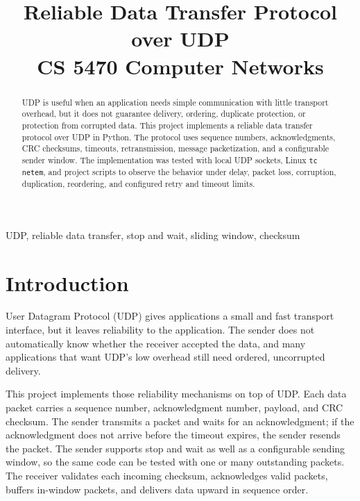 \documentclass[conference]{IEEEtran}
\begin{document}
\title{Reliable Data Transfer Protocol over UDP\\
{\footnotesize CS 5470 Computer Networks}
}

\author{
\and
{}
}

\maketitle

\begin{abstract}
UDP is useful when an application needs simple communication with little
transport overhead, but it does not guarantee delivery, ordering, duplicate
protection, or protection from corrupted data. This project implements a
reliable data transfer protocol over UDP in Python. The protocol uses sequence
numbers, acknowledgments, CRC checksums, timeouts, retransmission, message
packetization, and a configurable sender window. The implementation was tested
with local UDP sockets, Linux \texttt{tc netem}, and project scripts to observe
the behavior under delay, packet loss, corruption, duplication, reordering, and
configured retry and timeout limits.
\end{abstract}

\begin{IEEEkeywords}
UDP, reliable data transfer, stop and wait, sliding window, checksum
\end{IEEEkeywords}

\section{Introduction}
User Datagram Protocol (UDP) gives applications a small and fast transport
interface, but it leaves reliability to the application. The sender does not
automatically know whether the receiver accepted the data, and many applications
that want UDP's low overhead still need ordered, uncorrupted delivery.

This project implements those reliability mechanisms on top of UDP. Each data
packet carries a sequence number, acknowledgment number, payload, and CRC
checksum. The sender transmits a packet and waits for an acknowledgment; if the
acknowledgment does not arrive before the timeout expires, the sender resends
the packet. The sender supports stop and wait as well as a configurable sending
window, so the same code can be tested with one or many outstanding packets.
The receiver validates each incoming checksum, acknowledges valid packets,
buffers in-window packets, and delivers data upward in sequence order.
\end{document}
